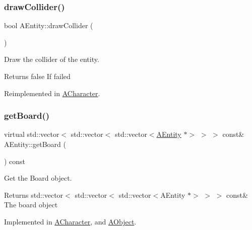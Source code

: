 \mbox{\label{class_a_entity_aca789d9c82a5fd3da3b196a36e748e8b}} 
\subsubsection{\texorpdfstring{draw\+Collider()}{drawCollider()}}
{\footnotesize\ttfamily bool A\+Entity\+::draw\+Collider (\begin{DoxyParamCaption}{ }\end{DoxyParamCaption})\hspace{0.3cm}{\ttfamily [virtual]}}



Draw the collider of the entity. 

\begin{DoxyReturn}{Returns}
false If failed 
\end{DoxyReturn}


Reimplemented in \hyperlink{class_a_character_a2cc5faf1d9047d9e51154d5663fa6c67}{A\+Character}.

\mbox{\label{class_a_entity_a9ed84c8f926cf6032be480ebba7d1820}} 
\subsubsection{\texorpdfstring{get\+Board()}{getBoard()}\hspace{0.1cm}{\footnotesize\ttfamily [1/2]}}
{\footnotesize\ttfamily virtual std\+::vector$<$ std\+::vector$<$ std\+::vector$<$\hyperlink{class_a_entity}{A\+Entity} $\ast$$>$ $>$ $>$ const\& A\+Entity\+::get\+Board (\begin{DoxyParamCaption}{ }\end{DoxyParamCaption}) const\hspace{0.3cm}{\ttfamily [pure virtual]}}



Get the Board object. 

\begin{DoxyReturn}{Returns}
std\+::vector$<$ std\+::vector$<$ std\+::vector$<$\+A\+Entity $\ast$$>$ $>$ $>$ const\& The board object 
\end{DoxyReturn}


Implemented in \hyperlink{class_a_character_adecb8064d5070f15a2d6aa76a151ff33}{A\+Character}, and \hyperlink{class_a_object_ac4a82eef484c0f7bf3547a7f7f6dce7e}{A\+Object}.

